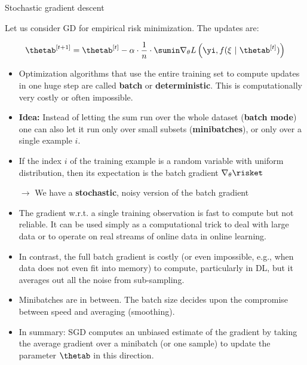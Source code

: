 \begin{vbframe}{Stochastic gradient descent}

Let us consider GD for empirical risk minimization. The updates are: 

$$
  \thetab^{[t + 1]} = \thetab^{[t]} - \alpha \cdot \frac{1}{n} \cdot \sumin \nabla_\theta L\left(\yi, f(\xi ~|~ \thetab^{[t]})\right)
$$


  \begin{itemize}
    \item Optimization algorithms that use the entire training set to compute updates in one huge step are called \textbf{batch} or \textbf{deterministic}. This is computationally very costly or often impossible. 
    \item \textbf{Idea:} Instead of letting the sum run over the whole dataset (\textbf{batch mode}) one can also let it run only over small subsets (\textbf{minibatches}), or only over a single example $i$. 
     \item If the index $i$ of the training example is a random variable with uniform distribution, then its expectation is the batch gradient $\nabla_\theta \risket$
    \item[$\to$] We have a \textbf{stochastic}, noisy version of the batch gradient

    \framebreak 

    \item The gradient w.r.t. a single training observation is fast to compute but not reliable. It can be used simply as a computational trick to deal with large data or to operate on real streams of online data in online learning.
    \item In contrast, the full
    batch gradient is costly (or even impossible, e.g., when data does not even fit into memory) to compute, particularly in DL, but it averages out all the noise from sub-sampling.
    \item Minibatches are in between. The batch size decides upon the compromise
    between speed and averaging (smoothing).
    \item In summary: SGD computes an unbiased estimate of the gradient by taking the average gradient over a minibatch (or one sample) to update the parameter $\thetab$ in this direction.
  \end{itemize}
 

\end{vbframe}
